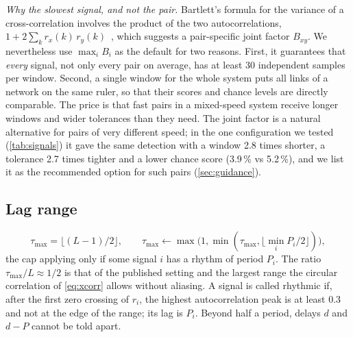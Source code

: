 \documentclass[11pt,a4paper]{article}
\begin{document}
\emph{Why the slowest signal, and not the pair.} Bartlett's formula for the variance of a cross-correlation involves the product of the two autocorrelations, $1 + 2\sum_k r_x(k)\,r_y(k)$~\cite{Bartlett1946TheoreticalSpecification}, which suggests a pair-specific joint factor $B_{xy}$. We nevertheless use $\max_i B_i$ as the default for two reasons. First, it guarantees that \emph{every} signal, not only every pair on average, has at least 30 independent samples per window. Second, a single window for the whole system puts all links of a network on the same ruler, so that their scores and chance levels are directly comparable. The price is that fast pairs in a mixed-speed system receive longer windows and wider tolerances than they need. The joint factor is a natural alternative for pairs of very different speed; in the one configuration we tested (\cref{tab:signals}) it gave the same detection with a window 2.8 times shorter, a tolerance 2.7 times tighter and a lower chance score (3.9\,\% vs 5.2\,\%), and we list it as the recommended option for such pairs (\cref{sec:guidance}).

\subsection{Lag range}
\label{sec:lag}
\begin{equation}
\tau_{\max} = \big\lfloor (L-1)/2 \big\rfloor, \qquad \tau_{\max} \leftarrow \max\!\big(1, \min(\tau_{\max}, \lfloor \min_i P_i / 2 \rfloor)\big),
\end{equation}
the cap applying only if some signal $i$ has a rhythm of period $P_i$.
The ratio $\tau_{\max} / L \approx 1/2$ is that of the published setting and the largest range the circular correlation of \cref{eq:xcorr} allows without aliasing. A signal is called rhythmic if, after the first zero crossing of $r_i$, the highest autocorrelation peak is at least 0.3 and not at the edge of the range; its lag is $P_i$. Beyond half a period, delays $d$ and $d - P$ cannot be told apart.
\end{document}
